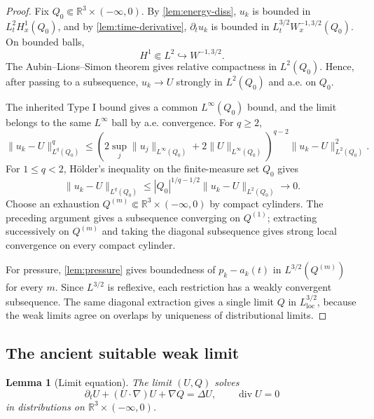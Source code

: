 \documentclass[11pt]{amsart}
\theoremstyle{plain}
\newtheorem{lemma}[theorem]{Lemma}
\theoremstyle{definition}
\theoremstyle{remark}
\numberwithin{equation}{section}
\newcommand{\R}{\mathbb R}
\newcommand{\loc}{\mathrm{loc}}
\newcommand{\divergence}{\operatorname{div}}
\begin{document}
\begin{proof}
Fix \(Q_0\Subset\R^3\times(-\infty,0)\).  By
\cref{lem:energy-diss}, \(u_k\) is bounded in \(L^2_tH^1_x(Q_0)\), and by
\cref{lem:time-derivative}, \(\partial_tu_k\) is bounded in
\(L^{3/2}_tW^{-1,3/2}_x(Q_0)\).  On bounded balls,
\[
   H^1\Subset L^2\hookrightarrow W^{-1,3/2}.
\]
The Aubin--Lions--Simon theorem \cite{Aubin1963,LionsMagenes,Simon1987} gives
relative compactness in \(L^2(Q_0)\).  Hence, after passing to a subsequence,
\(u_k\to U\) strongly in \(L^2(Q_0)\) and a.e. on \(Q_0\).

The inherited Type I bound gives a common \(L^\infty(Q_0)\) bound, and the
limit belongs to the same \(L^\infty\) ball by a.e. convergence.  For
\(q\ge2\),
\[
   \|u_k-U\|_{L^q(Q_0)}^q
   \le
   (2\sup_j\|u_j\|_{L^\infty(Q_0)}+2\|U\|_{L^\infty(Q_0)})^{q-2}
   \|u_k-U\|_{L^2(Q_0)}^2.
\]
For \(1\le q<2\), H\"older's inequality on the finite-measure set \(Q_0\)
gives
\[
   \|u_k-U\|_{L^q(Q_0)}
   \le |Q_0|^{1/q-1/2}\|u_k-U\|_{L^2(Q_0)}\to0.
\]
Choose an exhaustion \(Q^{(m)}\Subset\R^3\times(-\infty,0)\) by compact
cylinders.  The preceding argument gives a subsequence converging on
\(Q^{(1)}\); extracting successively on \(Q^{(m)}\) and taking the diagonal
subsequence gives strong local convergence on every compact cylinder.

For pressure, \cref{lem:pressure} gives boundedness of
\(p_k-a_k(t)\) in \(L^{3/2}(Q^{(m)})\) for every \(m\).  Since
\(L^{3/2}\) is reflexive, each restriction has a weakly convergent
subsequence.  The same diagonal extraction gives a single limit \(Q\) in
\(L^{3/2}_{\loc}\), because the weak limits agree on overlaps by uniqueness
of distributional limits.
\end{proof}

\subsection{The ancient suitable weak limit}

\begin{lemma}[Limit equation]\label{lem:limit-equation}
The limit \((U,Q)\) solves
\[
   \partial_tU+(U\cdot\nabla)U+\nabla Q=\Delta U,\qquad
   \divergence U=0
\]
in distributions on \(\R^3\times(-\infty,0)\).
\end{lemma}
\end{document}
